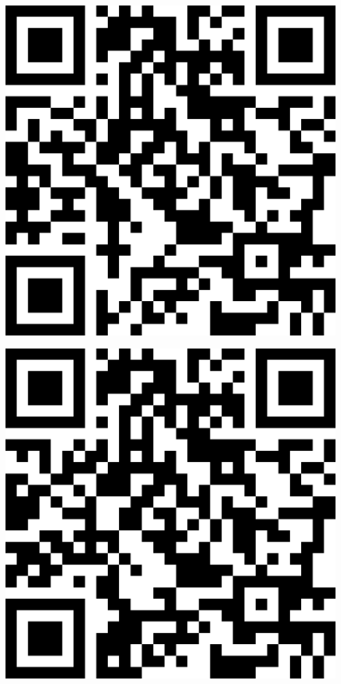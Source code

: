 \documentclass[letterpaper]{article}
\begin{document}
 \endgroup 
 \vspace*{\fill} 
 \pagebreak 
{} 
 \vspace*{\fill} 
 \begingroup 
 \centerline{\includegraphics[scale=1,width=5in,height=5in]{Office3557.png}} 
 \endgroup 
 \vspace*{\fill} 
 \pagebreak 
{} 
 \vspace*{\fill} 
 \begingroup 
 \centerline{\includegraphics[scale=1,width=5in,height=5in]{Office3559.png}} 
\end{document}

